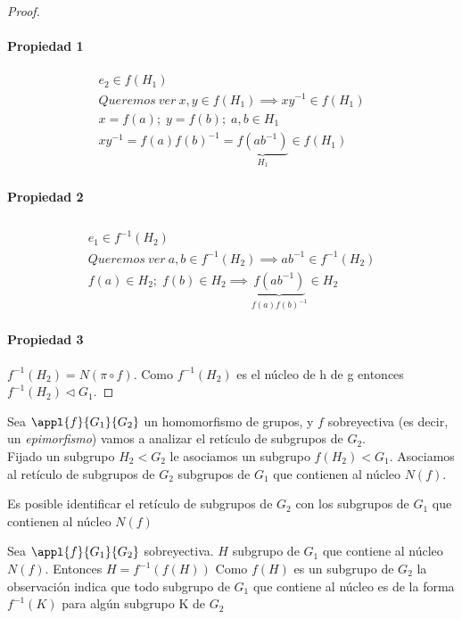 \documentclass[nochap]{apuntes}
\begin{document}
\begin{proof}
\paragraph{Propiedad 1}
\begin{gather*}
e_2 \in f(H_1)\\
Queremos \ ver \ x, y\in f(H_1) \implies xy^{-1}\in f(H_1)\\
x=f(a);\; y = f(b);\; a, b\in H_1\\
xy^{-1}=f(a)f(b)^{-1} = \underbrace{f(ab^{-1})}_{H_1} \in f(H_1)
\end{gather*}

\paragraph{Propiedad 2}
\begin{gather*}
\\ e_1 \in f^{-1}(H_2)\\
Queremos \ ver \  a, b \in f^{-1}(H_2) \implies ab^{-1} \in f^{-1}(H_2)\\
f(a) \in H_2;\; f(b) \in H_2 \implies \underbrace{f(ab^{-1})}_{f(a)f(b)^{-1}}\in H_2
\end{gather*}

\paragraph{Propiedad 3}
$f^{-1}(H_2) = N(\pi \circ f)$. Como $f^{-1}(H_2)$ es el núcleo de h de g entonces $f^{-1}(H_2)\lhd G_1$.
\end{proof}


Sea $\appl{f}{G_1}{G_2}$ un homomorfismo de grupos, y $f$ sobreyectiva (es decir, un \textit{epimorfismo})
vamos a analizar el retículo de subgrupos de $G_2$.\\
Fijado un subgrupo $H_2<G_2$ le asociamos un subgrupo $f(H_2)<G_1$. Asociamos al retículo de subgrupos de $G_2$ subgrupos de $G_1$ que contienen al núcleo $N(f)$.
\begin{theorem}
Es posible identificar el retículo de subgrupos de $G_2$ con los subgrupos de $G_1$ que contienen al núcleo $N(f)$
\end{theorem}

\obs Sea $\appl{f}{G_1}{G_2}$ sobreyectiva. $H$ subgrupo de $G_1$ que contiene al núcleo $N(f)$. Entonces $H = f^{-1}(f(H))$
Como $f(H)$ es un subgrupo de $G_2$ la observación indica que todo subgrupo de $G_1$ que contiene al núcleo es de la forma $f^{-1}(K)$ para algún subgrupo K de $G_2$
\end{document}

